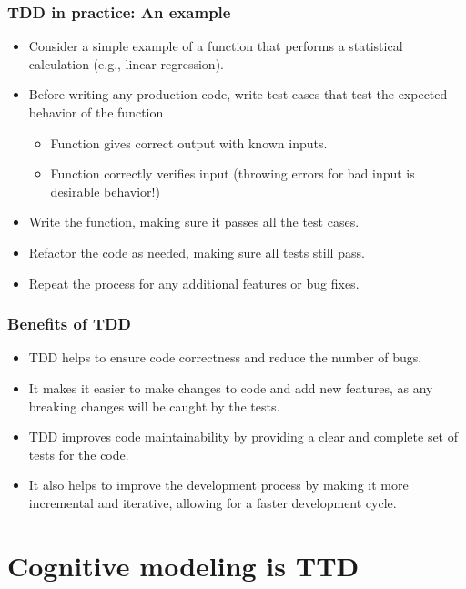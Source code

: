 \documentclass{beamer}
\begin{document}
\begin{frame}
\frametitle{TDD in practice: An example}
\begin{itemize}
\item Consider a simple example of a function that performs a statistical calculation (e.g., linear regression).
\item Before writing any production code, write test cases that test the expected behavior of the function
\begin{itemize}
\item Function gives correct output with known inputs.
\item Function correctly verifies input (throwing errors for bad input is desirable behavior!)
\end{itemize}
\item Write the function, making sure it passes all the test cases.
\item Refactor the code as needed, making sure all tests still pass.
\item Repeat the process for any additional features or bug fixes.
\end{itemize}
\end{frame}

\begin{frame}
\frametitle{Benefits of TDD}
\begin{itemize}
\item TDD helps to ensure code correctness and reduce the number of bugs.
\item It makes it easier to make changes to code and add new features, as any breaking changes will be caught by the tests.
\item TDD improves code maintainability by providing a clear and complete set of tests for the code.
\item It also helps to improve the development process by making it more incremental and iterative, allowing for a faster development cycle.
\end{itemize}
\end{frame}


\section{Cognitive modeling is TTD}
\end{document}
